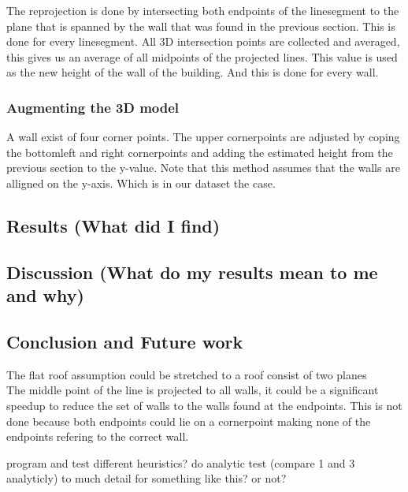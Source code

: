 	The reprojection is done by intersecting both endpoints of the linesegment to the plane that is spanned by the wall that was found in the 
previous section.
	This is done for every linesegment. 
	All 3D intersection points are collected and averaged, this gives us an average of all midpoints of the projected lines.
	This value is used as the new height of the wall of the building.
	And this is done for every wall.
	

\subsubsection{Augmenting the 3D model} %
	A wall exist of four corner points. The upper cornerpoints are adjusted
	by coping the bottomleft and right cornerpoints and adding the estimated height from the previous section to the y-value.
	Note that this method assumes that the walls are alligned on the y-axis. Which is in our dataset the case.



\subsection{Results (What did I find)}
\subsection{Discussion (What do my results mean to me and why)}
\subsection{Conclusion and Future work}
The flat roof assumption could be stretched to a roof consist of two planes
\\
The middle point of the line is projected to all walls, it could be a significant speedup to reduce the set of walls to the walls found at the endpoints. This is not done because both endpoints could lie on a cornerpoint making none of the endpoints refering to the correct wall.


program and test different heuristics?
do analytic test (compare 1 and 3 analyticly)
	to much detail for something like this? or not?


